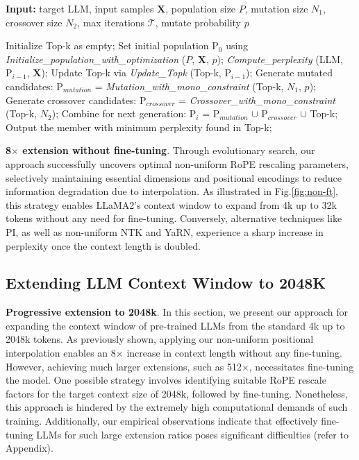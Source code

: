 \begin{algorithm}[t]
	\small
	\caption{The search algorithm}
	\textbf{Input:} target LLM, input samples $\mathbf{X}$, population size $P$, mutation size $N_1$, crossover size $N_2$, max iterations $\mathcal{T}$, mutate probability $p$\\

	\begin{algorithmic}[1]
		\label{alg:search}
		\STATE Initialize Top-k as empty;	
		\STATE Set initial population $\text{P}_0$ using \textit{Initialize\_population\_with\_optimization} ($P$, $\mathbf{X}$, $p$); 
		\STATE \textit{Compute\_perplexity} (LLM, $\text{P}_{i-1}$, $\mathbf{X}$);
		\STATE  Update Top-k via \textit{Update\_Topk} (Top-k, $\text{P}_{i-1}$);
		\STATE Generate mutated candidates: $\text{P}_{mutation}$ = \textit{Mutation\_with\_mono\_constraint} (Top-k, $N_1$, $p$); 
		\STATE Generate crossover candidates: $\text{P}_{crossover}$ = \textit{Crossover\_with\_mono\_constraint} (Top-k, $N_2$);
		\STATE Combine for next generation: $\text{P}_i$ = $\text{P}_{mutation}$ $\cup$ $\text{P}_{crossover}$ $\cup$ Top-k;
		\ENDFOR
		\STATE Output the member with minimum perplexity found in Top-k;
	\end{algorithmic}
\end{algorithm}

\textbf{8$\times$ extension without fine-tuning}. Through evolutionary search, our approach successfully uncovers optimal non-uniform RoPE rescaling parameters, selectively maintaining essential dimensions and positional encodings to reduce information degradation due to interpolation. As illustrated in Fig.\ref{fig:non-ft}, this strategy enables LLaMA2’s context window to expand from 4k up to 32k tokens without any need for fine-tuning. Conversely, alternative techniques like PI, as well as non-uniform NTK and YaRN, experience a sharp increase in perplexity once the context length is doubled.

\subsection{Extending LLM Context Window to 2048K}
\label{sec:extendto2048k}

\textbf{Progressive extension to 2048k}. In this section, we present our approach for expanding the context window of pre-trained LLMs from the standard 4k up to 2048k tokens. As previously shown, applying our non-uniform positional interpolation enables an 8$\times$ increase in context length without any fine-tuning. However, achieving much larger extensions, such as 512$\times$, necessitates fine-tuning the model. One possible strategy involves identifying suitable RoPE rescale factors for the target context size of 2048k, followed by fine-tuning. Nonetheless, this approach is hindered by the extremely high computational demands of such training. Additionally, our empirical observations indicate that effectively fine-tuning LLMs for such large extension ratios poses significant difficulties (refer to Appendix).

